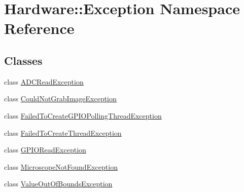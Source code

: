 \hypertarget{namespace_hardware_1_1_exception}{}\section{Hardware\+:\+:Exception Namespace Reference}
\label{namespace_hardware_1_1_exception}
\subsection*{Classes}
\begin{DoxyCompactItemize}
\item 
class \hyperlink{class_hardware_1_1_exception_1_1_a_d_c_read_exception}{A\+D\+C\+Read\+Exception}
\item 
class \hyperlink{class_hardware_1_1_exception_1_1_could_not_grab_image_exception}{Could\+Not\+Grab\+Image\+Exception}
\item 
class \hyperlink{class_hardware_1_1_exception_1_1_failed_to_create_g_p_i_o_polling_thread_exception}{Failed\+To\+Create\+G\+P\+I\+O\+Polling\+Thread\+Exception}
\item 
class \hyperlink{class_hardware_1_1_exception_1_1_failed_to_create_thread_exception}{Failed\+To\+Create\+Thread\+Exception}
\item 
class \hyperlink{class_hardware_1_1_exception_1_1_g_p_i_o_read_exception}{G\+P\+I\+O\+Read\+Exception}
\item 
class \hyperlink{class_hardware_1_1_exception_1_1_microscope_not_found_exception}{Microscope\+Not\+Found\+Exception}
\item 
class \hyperlink{class_hardware_1_1_exception_1_1_value_out_of_bounds_exception}{Value\+Out\+Of\+Bounds\+Exception}
\end{DoxyCompactItemize}

